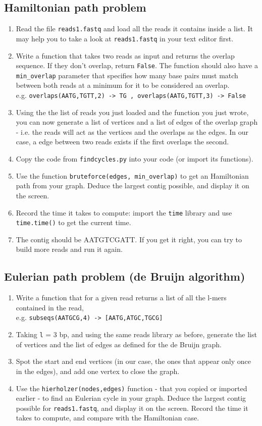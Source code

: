 \documentclass[a4paper,11pt]{article}
\begin{document}
\subsection{Hamiltonian path problem}
\begin{enumerate}
\item Read the file \texttt{reads1.fastq} and load all the reads it contains inside a list. It may help you to take a look at \texttt{reads1.fastq} in your text editor first.
\item Write a function that takes two reads as input and returns the overlap sequence. If they don't overlap, return \texttt{False}. The function should also have a \texttt{min\_overlap} parameter that specifies how many base pairs must match between both reads at a minimum for it to be considered an overlap. \\
e.g. \texttt{overlaps(AATG,TGTT,2) -> TG , overlaps(AATG,TGTT,3) -> False}
\item Using the the list of reads you just loaded and the function you just wrote, you can now generate a list of vertices and a list of edges of the overlap graph - i.e. the reads will act as the vertices and the overlaps as the edges. In our case, a edge between two reads exists if the first overlaps the second.
\item Copy the code from \texttt{findcycles.py} into your code (or import its functions).
\item Use the function \texttt{bruteforce(edges, min\_overlap)} to get an Hamiltonian path from your graph. Deduce the largest contig possible, and display it on the screen.
\item Record the time it takes to compute: import the \texttt{time} library and use \texttt{time.time()} to get the current time.
\item The contig should be AATGTCGATT. If you get it right, you can try to build more reads and run it again.
\end{enumerate}

\subsection{Eulerian path problem (de Bruijn algorithm)}
\begin{enumerate}
\item Write a function that for a given read returns a list of all the l-mers contained in the read, \\
e.g. \texttt{subseqs(AATGCG,4) ->  [AATG,ATGC,TGCG]}
\item Taking \texttt{l} = 3 bp, and using the same reads library as before, generate the list of vertices and the list of edges as defined for the de Bruijn graph.
\item Spot the start and end vertices (in our case, the ones that appear only once in the edges), and add one vertex to close the graph.
\item Use the \texttt{hierholzer(nodes,edges)} function - that you copied or imported earlier - to find an Eulerian cycle in your graph. Deduce the largest contig possible for \texttt{reads1.fastq}, and display it on the screen. Record the time it takes to compute, and compare with the Hamiltonian case.
\end{enumerate}
\end{document}
